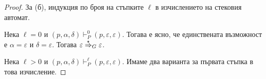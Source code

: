 \begin{proof}
  
  За (б), индукция по броя на стъпките $\ell$ в изчислението на стековия автомат.
    
      Нека $\ell = 0$ и $(p, \alpha, \delta) \vdash^{0}_P (p, \varepsilon, \varepsilon)$. Тогава е ясно, че единствената възможност е $\alpha = \varepsilon$ и $\delta = \varepsilon$.
      Тогава $\varepsilon \stackrel{{\star}}{\Rightarrow}_G \varepsilon$.
      
      Нека $\ell > 0$ и $(p, \alpha, \delta) \vdash^{\ell}_P (p, \varepsilon, \varepsilon)$.      
      Имаме два варианта за първата стъпка в това изчисление.
      

\end{proof}
